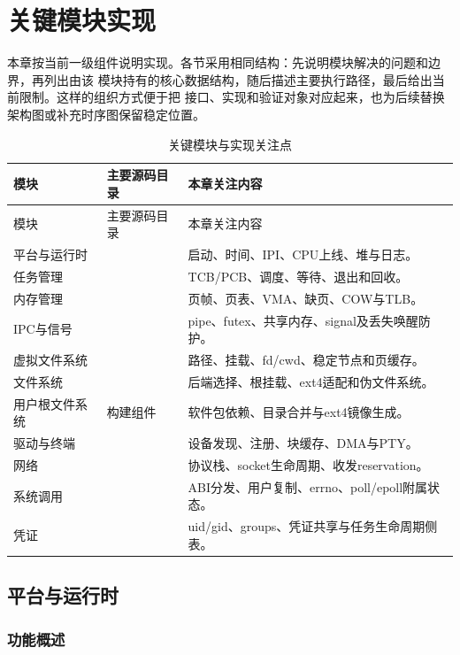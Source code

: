 \chapter{关键模块实现}

本章按当前一级组件说明实现。各节采用相同结构：先说明模块解决的问题和边界，再列出由该
模块持有的核心数据结构，随后描述主要执行路径，最后给出当前限制。这样的组织方式便于把
接口、实现和验证对象对应起来，也为后续替换架构图或补充时序图保留稳定位置。

\begin{longtable}{L{3.1cm}L{4.2cm}L{5.9cm}}
  \caption{关键模块与实现关注点}\label{tab:chapter3-boundary}\\
  \toprule
  模块 & 主要源码目录 & 本章关注内容 \\
  \midrule
  \endfirsthead
  \toprule
  模块 & 主要源码目录 & 本章关注内容 \\
  \midrule
  \endhead
  平台与运行时 &  & 启动、时间、IPI、CPU上线、堆与日志。\\
  任务管理 &  & TCB/PCB、调度、等待、退出和回收。\\
  内存管理 &  & 页帧、页表、VMA、缺页、COW与TLB。\\
  IPC与信号 &  & pipe、futex、共享内存、signal及丢失唤醒防护。\\
  虚拟文件系统 &  & 路径、挂载、fd/cwd、稳定节点和页缓存。\\
  文件系统 &  & 后端选择、根挂载、ext4适配和伪文件系统。\\
  用户根文件系统 & 构建组件 & 软件包依赖、目录合并与ext4镜像生成。\\
  驱动与终端 &  & 设备发现、注册、块缓存、DMA与PTY。\\
  网络 &  & 协议栈、socket生命周期、收发reservation。\\
  系统调用 &  & ABI分发、用户复制、errno、poll/epoll附属状态。\\
  凭证 &  & uid/gid、groups、凭证共享与任务生命周期侧表。\\
  \bottomrule
\end{longtable}

\section{平台与运行时}

\subsection{功能概述}

